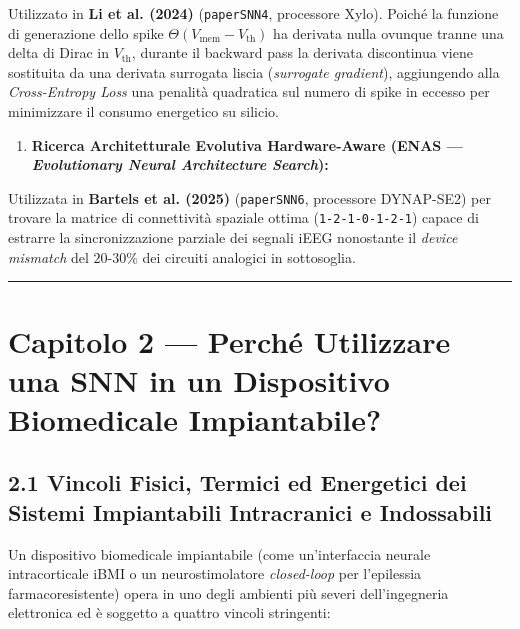 \documentclass[11pt,a4paper]{article}
\begin{document}
Utilizzato in \textbf{Li et al. (2024)} (\texttt{paperSNN4}, processore Xylo). Poiché la funzione di generazione dello spike $\Theta(V_{\text{mem}} - V_{\text{th}})$ ha derivata nulla ovunque tranne una delta di Dirac in $V_{\text{th}}$, durante il backward pass la derivata discontinua viene sostituita da una derivata surrogata liscia (\textit{surrogate gradient}), aggiungendo alla \textit{Cross-Entropy Loss} una penalità quadratica sul numero di spike in eccesso per minimizzare il consumo energetico su silicio.
\begin{enumerate}
  \item \textbf{Ricerca Architetturale Evolutiva Hardware-Aware (ENAS --- \textit{Evolutionary Neural Architecture Search}):}
\end{enumerate}
Utilizzata in \textbf{Bartels et al. (2025)} (\texttt{paperSNN6}, processore DYNAP-SE2) per trovare la matrice di connettività spaziale ottima (\texttt{1-2-1-0-1-2-1}) capace di estrarre la sincronizzazione parziale dei segnali iEEG nonostante il \textit{device mismatch} del $20\text{-}30\%$ dei circuiti analogici in sottosoglia.

\bigskip\hrule\bigskip

\section{Capitolo 2 --- Perché Utilizzare una SNN in un Dispositivo Biomedicale Impiantabile?}

\subsection{2.1 Vincoli Fisici, Termici ed Energetici dei Sistemi Impiantabili Intracranici e Indossabili}

Un dispositivo biomedicale impiantabile (come un'interfaccia neurale intracorticale iBMI o un neurostimolatore \textit{closed-loop} per l'epilessia farmacoresistente) opera in uno degli ambienti più severi dell'ingegneria elettronica ed è soggetto a quattro vincoli stringenti:
\end{document}
